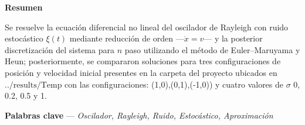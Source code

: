 



\Large


\begin{center}

    \textbf{Resumen}
    
        Se resuelve la ecuación diferencial no lineal del oscilador de Rayleigh con ruido estocástico $\xi(t)$ mediante reducción de orden ---$\dot{x} = v$--- y la posterior discretización del sistema para $n$ paso utilizando el método de  Euler–Maruyama y Heun; posteriormente, se compararon soluciones para tres configuraciones de posición y velocidad inicial presentes en la carpeta del proyecto ubicados en $../\text{results}/\text{Temp}$ con las configuraciones: (1,0),(0,1),(-1,0)) y cuatro valores de $\sigma$ 0, 0.2, 0.5 y 1.
    
    \vspace{10pt}
     
        \textbf{Palabras clave} --- \textit{Oscilador, Rayleigh, Ruido, Estocástico, Aproximación}
    
    \vspace{25pt}
     
\end{center}

